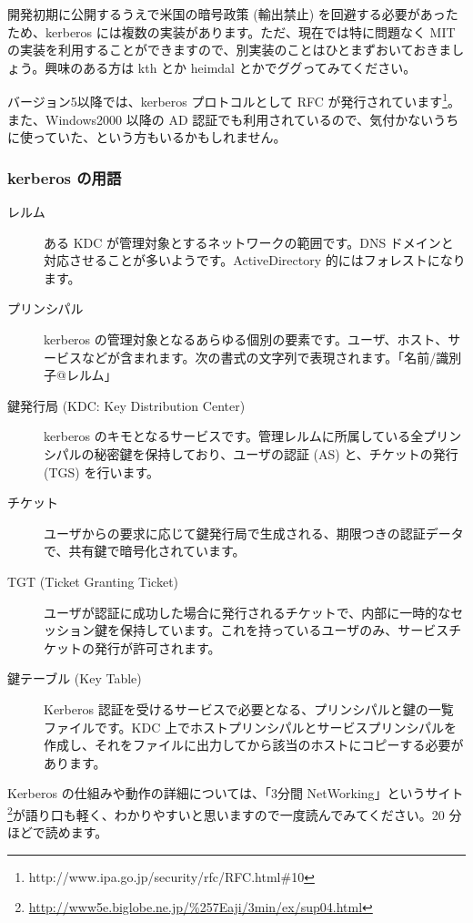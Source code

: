 \documentclass[mingoth,a4paper]{jsarticle}
\begin{document}
開発初期に公開するうえで米国の暗号政策 (輸出禁止) を回避する必要があったため、kerberos には複数の実装があります。ただ、現在では特に問題なく MIT の実装を利用することができますので、別実装のことはひとまずおいておきましょう。興味のある方は kth とか heimdal とかでググってみてください。

バージョン5以降では、kerberos プロトコルとして RFC が発行されています\footnote{http://www.ipa.go.jp/security/rfc/RFC.html\#10}。また、Windows2000 以降の AD 認証でも利用されているので、気付かないうちに使っていた、という方もいるかもしれません。

\subsubsection{kerberos の用語}

\begin{description}
  \item [レルム] ある KDC が管理対象とするネットワークの範囲です。DNS ドメインと対応させることが多いようです。ActiveDirectory 的にはフォレストになります。
  \item [プリンシパル] kerberos の管理対象となるあらゆる個別の要素です。ユーザ、ホスト、サービスなどが含まれます。次の書式の文字列で表現されます。「名前/識別子@レルム」

  \item [鍵発行局 (KDC: Key Distribution Center)] kerberos のキモとなるサービスです。管理レルムに所属している全プリンシパルの秘密鍵を保持しており、ユーザの認証 (AS) と、チケットの発行 (TGS) を行います。

  \item [チケット] ユーザからの要求に応じて鍵発行局で生成される、期限つきの認証データで、共有鍵で暗号化されています。

  \item [TGT (Ticket Granting Ticket)] ユーザが認証に成功した場合に発行されるチケットで、内部に一時的なセッション鍵を保持しています。これを持っているユーザのみ、サービスチケットの発行が許可されます。
  \item [鍵テーブル (Key Table)] Kerberos 認証を受けるサービスで必要となる、プリンシパルと鍵の一覧ファイルです。KDC 上でホストプリンシパルとサービスプリンシパルを作成し、それをファイルに出力してから該当のホストにコピーする必要があります。

\end{description}

Kerberos の仕組みや動作の詳細については、「3分間 NetWorking」というサイト\footnote{\url{http://www5e.biglobe.ne.jp/\%257Eaji/3min/ex/sup04.html}}が語り口も軽く、わかりやすいと思いますので一度読んでみてください。20 分ほどで読めます。
\end{document}
